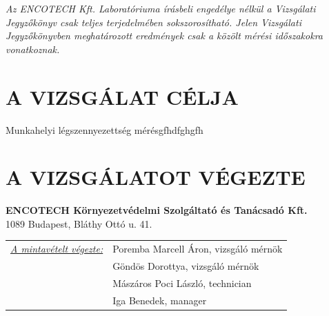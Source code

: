 \documentclass[a4paper,12pt]{article}
\begin{document}
	\begin{center}
		{\scriptsize 
			\textit{
				Az ENCOTECH Kft. Laboratóriuma írásbeli engedélye nélkül a Vizsgálati Jegyzőkönyv csak teljes terjedelmében sokszorosítható. 
				Jelen Vizsgálati Jegyzőkönyvben meghatározott eredmények csak a közölt mérési időszakokra vonatkoznak.
		}}  
	\end{center}
	
	\newpage
	

	\tableofcontents
	

	\newpage  %
	\pagestyle{report}
	
	
	\section{A VIZSGÁLAT CÉLJA}
		\begin{adjustwidth}{1cm}{0cm}
		Munkahelyi légszennyezettség mérésgfhdfghgfh
		\end{adjustwidth}
	
	
	\section{A VIZSGÁLATOT VÉGEZTE}
		\begin{adjustwidth}{1cm}{0cm}
			\noindent
			\textbf{ENCOTECH Környezetvédelmi Szolgáltató és Tanácsadó Kft.} \\
			1089 Budapest, Bláthy Ottó u. 41.
			
			\vspace{1.0em} %
			
			\noindent
			\begin{tabular}{ p{5.5cm} p{8cm} } 
				\textit{\underline{A mintavételt végezte:}} & Poremba Marcell Áron, vizsgáló mérnök \\ & Göndös Dorottya, vizsgáló mérnök \\ & Mászáros Poci László, technician \\ & Iga Benedek, manager \\ 
			\end{tabular}
		\end{adjustwidth}
	
\end{document}
